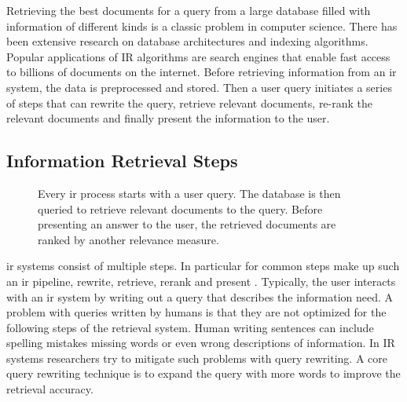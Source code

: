 \documentclass[../main.tex]{subfiles}
\begin{document}
Retrieving the best documents for a query from a large database
filled with information of different kinds is a classic problem in computer science.
There has been extensive research on database architectures and indexing algorithms.
Popular applications of IR algorithms are search engines
that enable fast access to billions of documents on the internet.
Before retrieving information from an \gls{ir} system,
the data is preprocessed and stored.
Then a user query initiates a series of steps that can rewrite the query,
retrieve relevant documents,
re-rank the relevant documents and finally present the information to the user.

\subsection{Information Retrieval Steps}

\begin{figure}[t]
    \centering
    \caption{Every \gls{ir} process starts with a user query.
        The database is then queried to retrieve relevant documents to the query.
        Before presenting an answer to the user, the retrieved documents are ranked by another relevance measure.}
    \label{fig:ir_steps}
\end{figure}
\Gls{ir} systems consist of multiple steps.
In particular for common steps make up such an \gls{ir} pipeline,
rewrite, retrieve, rerank and present \cite{Zhu2024}.
Typically, the user interacts with an \gls{ir} system
by writing out a query that describes the information need.
A problem with queries written by humans is that they are not optimized for the following steps of the retrieval system.
Human writing sentences can include spelling mistakes missing words or even wrong descriptions of information.
In IR systems researchers try to mitigate such problems with query rewriting.
A core query rewriting technique is to expand the query with more words to improve the retrieval accuracy.
\end{document}
